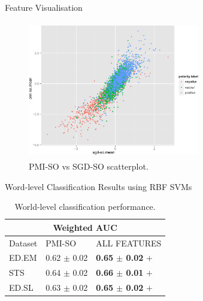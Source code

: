 \documentclass[handout]{beamer}
\begin{document}
\begin{frame}{Feature Visualisation}
\begin{scriptsize}
\begin{figure}[htb]
	\centering
	 \includegraphics[width=7.5cm,height=6cm]{pics/SGDSO-new.pdf}
	\caption{PMI-SO vs SGD-SO scatterplot.}
	\label{fig:sosgd}
\end{figure}
\end{scriptsize}

\end{frame}


\begin{frame}{Word-level Classification Results using RBF SVMs}
\footnotesize
\begin{table}[!htb]
\begin{center}
\begin{tabular}{l|l|l}
\hline \hline
\multicolumn{ 3}{c}{Weighted AUC } \\ \hline \hline
Dataset & PMI-SO & ALL FEATURES \\ \hline
ED.EM & 0.62 $\pm$ 0.02 &  \textbf{0.65 $\pm$ 0.02} $+$ \\  
STS & 0.64 $\pm$ 0.02 & \textbf{0.66 $\pm$ 0.01} $+$   \\ 
ED.SL &  0.63 $\pm$ 0.02 & \textbf{0.65  $\pm$  0.02} $+$ \\ \hline 
\end{tabular}
\end{center}
\caption{World-level classification performance.} 
\label{tab:classres}
\end{table}
\end{frame}
\end{document}
